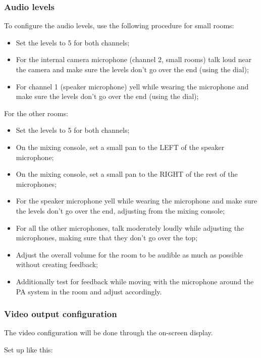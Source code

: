 \documentclass{article}
\begin{document}
\subsubsection{Audio levels}

To configure the audio levels, use the following procedure for small rooms:
\begin{itemize}
  \item Set the levels to 5 for both channels;
  \item For the internal camera microphone (channel 2, small rooms) talk loud near the camera and make sure the levels don't go over the end (using the dial);
  \item For channel 1 (speaker microphone) yell while wearing the microphone and make sure the levels don't go over the end (using the dial);
\end{itemize}

For the other rooms:

\begin{itemize}
  \item Set the levels to 5 for both channels;
  \item On the mixing console, set a small pan to the LEFT of the speaker microphone;
  \item On the mixing console, set a small pan to the RIGHT of the rest of the microphones;
  \item For the speaker microphone yell while wearing the microphone and make sure the levels don't go over the end, adjusting from the mixing console;
  \item For all the other microphones, talk moderately loudly while adjusting the microphones, making sure that they don't go over the top;
  \item Adjust the overall volume for the room to be audible as much as possible without creating feedback;
  \item Additionally test for feedback while moving with the microphone around the PA system in the room and adjust accordingly.
\end{itemize}

\subsubsection{Video output configuration}
The video configuration will be done through the on-screen display.

Set up like this:
\end{document}
